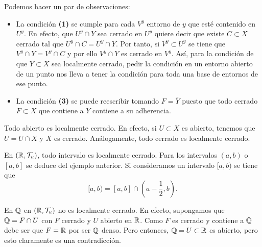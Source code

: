 \begin{observation}
Podemos hacer un par de observaciones:
\begin{itemize}
\item La condición \textbf{(1)} se cumple para cada $\displaystyle V^{y} $ entorno de $\displaystyle y $ que esté contenido en $\displaystyle U^{y} $. En efecto, que $\displaystyle U^{y}\cap Y $ sea cerrado en $\displaystyle U^{y} $ quiere decir que existe $\displaystyle C \subset X $ cerrado tal que $\displaystyle U^{y}\cap C = U^{y} \cap Y $. Por tanto, si $\displaystyle V^{y}\subset U^{y} $ se tiene que $\displaystyle V^{y}\cap Y = V^{y}\cap C $ y por ello $\displaystyle V^{y}\cap Y $ es cerrado en $\displaystyle V^{y} $. 
	Así, para la condición de que $\displaystyle Y\subset X $ sea localmente cerrado, pedir la condición en un entorno abierto de un punto nos lleva a tener la condición para toda una base de entornos de ese punto.
\item La condición \textbf{(3)} se puede reescribir tomando $\displaystyle F= \overline{Y} $ puesto que todo cerrado $\displaystyle F\subset X $ que contiene a $\displaystyle Y $ contiene a su adherencia. 
\end{itemize}
\end{observation}
\begin{eg}
Todo abierto es localmente cerrado. En efecto, si $\displaystyle U\subset X $ es abierto, tenemos que $\displaystyle U = U \cap X $ y $\displaystyle X $ es cerrado. Análogamente, todo cerrado es localmente cerrado. 
\end{eg}
\begin{eg}
	En $\displaystyle \left(\mathbb{R}, \mathcal{T}_{u}\right) $, todo intervalo es localmente cerrado. Para los intervalos $\displaystyle \left(a,b\right) $ o $\displaystyle [a,b] $ se deduce del ejemplo anterior. Si consideramos un intervalo $\displaystyle [a,b) $ se tiene que 
	\[[a,b) = \left[a,b\right] \cap \left(a-\frac{1}{2}, b\right) .\]
\end{eg}
\begin{eg}
En $\displaystyle \mathbb{Q}  $ en $\displaystyle \left(\mathbb{R}, \mathcal{T}_{u}\right) $ no es localmente cerrado. En efecto, supongamos que $\displaystyle \mathbb{Q} = F \cap U $ con $\displaystyle F $ cerrado y $\displaystyle U $ abierto en $\displaystyle \mathbb{R} $. Como $\displaystyle F $ es cerrado y contiene a $\displaystyle \mathbb{Q} $ debe ser que $\displaystyle F = \mathbb{R} $ por ser $\displaystyle \mathbb{Q} $ denso. Pero entonces, $\displaystyle \mathbb{Q} = U \subset \mathbb{R} $ es abierto, pero esto claramente es una contradicción.
\end{eg}
